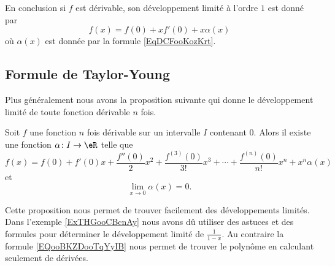 En conclusion si \( f\) est dérivable, son développement limité à l'ordre \(  1\) est donné par
\begin{equation}
    f(x)=f(0)+xf'(0)+x\alpha(x)
\end{equation}
où \( \alpha(x)\) est donnée par la formule \eqref{EqDCFooKozKrt}.

\subsection{Formule de Taylor-Young}

Plus généralement nous avons la proposition suivante qui donne le développement limité de toute fonction dérivable \( n\) fois.

\begin{proposition}    \label{PropVDGooCexFwy}
    Soit \( f\) une fonction \( n\) fois dérivable sur un intervalle \( I\) contenant \( 0\). Alors il existe une fonction \( \alpha\colon I\to \eR\) telle que
    \begin{equation}        \label{EQooBKZDooTqYyIB}
        f(x)=f(0)+f'(0)x+\frac{ f''(0) }{ 2 }x^2+\frac{ f^{(3)}(0) }{ 3! }x^3+\cdots +\frac{ f^{(n)}(0) }{ n! }x^n+x^n\alpha(x)
    \end{equation}
    et
    \begin{equation}
        \lim_{x\to 0} \alpha(x)=0.
    \end{equation}
\end{proposition}

Cette proposition nous permet de trouver facilement des développements limités. Dans l'exemple \ref{ExTHGooCBcnAy} nous avons dû utiliser des astuces et des formules pour déterminer le développement limité de \( \frac{1}{ 1-x }\). Au contraire la formule \eqref{EQooBKZDooTqYyIB} nous permet de trouver le polynôme en calculant seulement de dérivées.

